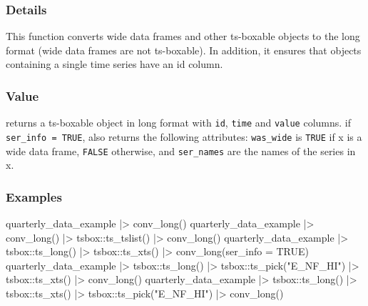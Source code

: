 \documentclass[
  letterpaper,
  DIV=11,
  numbers=noendperiod]{scrreport}
\newenvironment{Shaded}{\begin{snugshade}}{\end{snugshade}}
\newcommand{\AttributeTok}[1]{\textcolor[rgb]{0.40,0.45,0.13}{#1}}
\newcommand{\ConstantTok}[1]{\textcolor[rgb]{0.56,0.35,0.01}{#1}}
\newcommand{\FunctionTok}[1]{\textcolor[rgb]{0.28,0.35,0.67}{#1}}
\newcommand{\NormalTok}[1]{\textcolor[rgb]{0.00,0.23,0.31}{#1}}
\newcommand{\SpecialCharTok}[1]{\textcolor[rgb]{0.37,0.37,0.37}{#1}}
\newcommand{\StringTok}[1]{\textcolor[rgb]{0.13,0.47,0.30}{#1}}
\begin{document}
\subsubsection{Details}\label{details-15}

This function converts wide data frames and other ts-boxable objects to
the long format (wide data frames are not ts-boxable). In addition, it
ensures that objects containing a single time series have an id column.

\subsubsection{Value}\label{value-52}

returns a ts-boxable object in long format with \texttt{id},
\texttt{time} and \texttt{value} columns. if
\texttt{ser\_info\ =\ TRUE}, also returns the following attributes:
\texttt{was\_wide} is \texttt{TRUE} if x is a wide data frame,
\texttt{FALSE} otherwise, and \texttt{ser\_names} are the names of the
series in x.

\subsubsection{Examples}\label{examples-52}

\begin{Shaded}
\begin{Highlighting}[]
\NormalTok{quarterly\_data\_example }\SpecialCharTok{|\textgreater{}}
  \FunctionTok{conv\_long}\NormalTok{()}
\NormalTok{quarterly\_data\_example }\SpecialCharTok{|\textgreater{}}
  \FunctionTok{conv\_long}\NormalTok{() }\SpecialCharTok{|\textgreater{}}
\NormalTok{  tsbox}\SpecialCharTok{::}\FunctionTok{ts\_tslist}\NormalTok{() }\SpecialCharTok{|\textgreater{}}
  \FunctionTok{conv\_long}\NormalTok{()}
\NormalTok{quarterly\_data\_example }\SpecialCharTok{|\textgreater{}}
\NormalTok{  tsbox}\SpecialCharTok{::}\FunctionTok{ts\_long}\NormalTok{() }\SpecialCharTok{|\textgreater{}}
\NormalTok{  tsbox}\SpecialCharTok{::}\FunctionTok{ts\_xts}\NormalTok{() }\SpecialCharTok{|\textgreater{}}
  \FunctionTok{conv\_long}\NormalTok{(}\AttributeTok{ser\_info =} \ConstantTok{TRUE}\NormalTok{)}
\NormalTok{quarterly\_data\_example }\SpecialCharTok{|\textgreater{}}
\NormalTok{  tsbox}\SpecialCharTok{::}\FunctionTok{ts\_long}\NormalTok{() }\SpecialCharTok{|\textgreater{}}
\NormalTok{  tsbox}\SpecialCharTok{::}\FunctionTok{ts\_pick}\NormalTok{(}\StringTok{"E\_NF\_HI"}\NormalTok{) }\SpecialCharTok{|\textgreater{}}
\NormalTok{  tsbox}\SpecialCharTok{::}\FunctionTok{ts\_xts}\NormalTok{() }\SpecialCharTok{|\textgreater{}}
  \FunctionTok{conv\_long}\NormalTok{()}
\NormalTok{quarterly\_data\_example }\SpecialCharTok{|\textgreater{}}
\NormalTok{  tsbox}\SpecialCharTok{::}\FunctionTok{ts\_long}\NormalTok{() }\SpecialCharTok{|\textgreater{}}
\NormalTok{  tsbox}\SpecialCharTok{::}\FunctionTok{ts\_xts}\NormalTok{() }\SpecialCharTok{|\textgreater{}}
\NormalTok{  tsbox}\SpecialCharTok{::}\FunctionTok{ts\_pick}\NormalTok{(}\StringTok{"E\_NF\_HI"}\NormalTok{) }\SpecialCharTok{|\textgreater{}}
  \FunctionTok{conv\_long}\NormalTok{()}
\end{Highlighting}
\end{Shaded}
\end{document}
